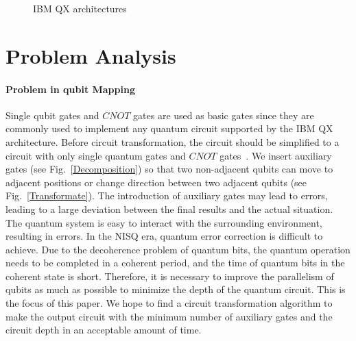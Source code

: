 \documentclass[runningheads]{llncs}
\begin{document}
\begin{figure}
{
}
\caption{IBM QX architectures}
\label{IBM}
\end{figure}


\section{Problem Analysis}
\label{Problem Analysis}

\paragraph{Problem in qubit Mapping}
Single qubit gates and $CNOT$ gates are used as basic gates since they are commonly used to implement any quantum circuit supported by the IBM QX architecture. Before circuit transformation, the circuit should be simplified to a circuit with only single quantum gates and $CNOT$ gates~\cite{2005Mttnen,1995Barenco}. We insert auxiliary gates (see Fig.~\ref{Decomposition}) so that two non-adjacent qubits can move to adjacent positions or change direction between two adjacent qubits (see Fig.~\ref{Transformate}). The introduction of auxiliary gates may lead to errors, leading to a large deviation between the final results and the actual situation. The quantum system is easy to interact with the surrounding environment, resulting in errors. In the NISQ era, quantum error correction is difficult to achieve. Due to the decoherence problem of quantum bits, the quantum operation needs to be completed in a coherent period, and the time of quantum bits in the coherent state is short. Therefore, it is necessary to improve the parallelism of qubits as much as possible to minimize the depth of the quantum circuit. This is the focus of this paper. We hope to find a circuit transformation algorithm to make the output circuit with the minimum number of auxiliary gates and the circuit depth in an acceptable amount of time.
\end{document}
